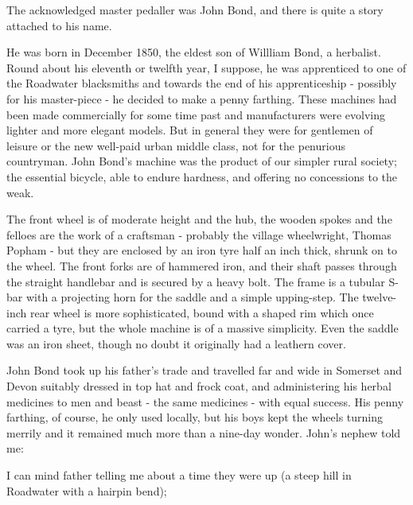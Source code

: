 The acknowledged master pedaller was John Bond, and there is quite a story attached to his name. 

He was born in December 1850, the eldest son of Willliam Bond, a herbalist. Round about his eleventh or twelfth year, I suppose, he was apprenticed to one of the Roadwater blacksmiths and towards the end of his apprenticeship - possibly for his master-piece - he decided to make a penny farthing. These machines had been made commercially for some time past and manufacturers were evolving lighter and more elegant models. But in general they were for gentlemen of leisure or the new well-paid urban middle class, not for the penurious countryman. John Bond's machine was the product of our simpler rural society; the essential bicycle, able to endure hardness, and offering no concessions to the weak.

The front wheel is of moderate height and the hub, the wooden spokes and the felloes are the work of a craftsman - probably the village wheelwright, Thomas Popham - but they are enclosed by an iron tyre half an inch thick, shrunk on to the wheel. The front forks are of hammered iron, and their shaft passes through the straight handlebar and is secured by a heavy bolt. The frame is a tubular S-bar with a projecting horn for the saddle and a simple upping-step. The twelve-inch rear wheel is more sophisticated, bound with a shaped rim which once carried a tyre, but the whole machine is of a massive simplicity. Even the saddle was an iron sheet, though no doubt it originally had a leathern cover.

John Bond took up his father's trade and travelled far and wide in Somerset and Devon suitably dressed in top hat and frock coat, and administering his herbal medicines to men and beast - the same medicines - with equal success. His penny farthing, of course, he only used locally, but his boys kept the wheels turning merrily and it remained much more than a nine-day wonder. John's nephew told me:

I can mind father telling me about a time they were up  (a steep hill in Roadwater with a hairpin bend);

\begin{quote}
\end{quote}
 
